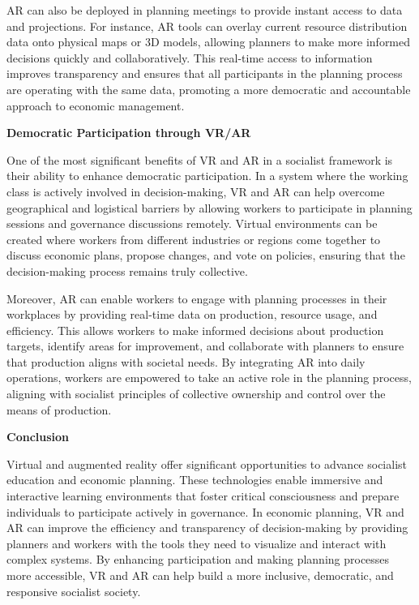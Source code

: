 \begin{refsection}
AR can also be deployed in planning meetings to provide instant access to data and projections. For instance, AR tools can overlay current resource distribution data onto physical maps or 3D models, allowing planners to make more informed decisions quickly and collaboratively. This real-time access to information improves transparency and ensures that all participants in the planning process are operating with the same data, promoting a more democratic and accountable approach to economic management.

\textbf{Democratic Participation through VR/AR}

One of the most significant benefits of VR and AR in a socialist framework is their ability to enhance democratic participation. In a system where the working class is actively involved in decision-making, VR and AR can help overcome geographical and logistical barriers by allowing workers to participate in planning sessions and governance discussions remotely. Virtual environments can be created where workers from different industries or regions come together to discuss economic plans, propose changes, and vote on policies, ensuring that the decision-making process remains truly collective.

Moreover, AR can enable workers to engage with planning processes in their workplaces by providing real-time data on production, resource usage, and efficiency. This allows workers to make informed decisions about production targets, identify areas for improvement, and collaborate with planners to ensure that production aligns with societal needs. By integrating AR into daily operations, workers are empowered to take an active role in the planning process, aligning with socialist principles of collective ownership and control over the means of production.

\textbf{Conclusion}

Virtual and augmented reality offer significant opportunities to advance socialist education and economic planning. These technologies enable immersive and interactive learning environments that foster critical consciousness and prepare individuals to participate actively in governance. In economic planning, VR and AR can improve the efficiency and transparency of decision-making by providing planners and workers with the tools they need to visualize and interact with complex systems. By enhancing participation and making planning processes more accessible, VR and AR can help build a more inclusive, democratic, and responsive socialist society.


\end{refsection}
